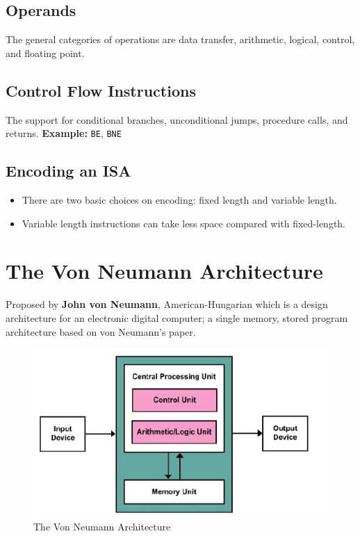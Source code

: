 \documentclass[9pt,twocolumn]{article}
\begin{document}
  \subsection*{Operands}
  The general categories of operations are data transfer, arithmetic, logical, control, and floating point.

  \subsection*{Control Flow Instructions}
  The support for conditional branches, unconditional jumps, procedure calls, and returns. \textbf{Example:} \texttt{BE}, \texttt{BNE}

  \subsection*{Encoding an ISA}
  \begin{itemize}
    \item There are two basic choices on encoding: fixed length and variable length.
    \item Variable length instructions can take less space compared with fixed-length.
  \end{itemize}

\section*{The Von Neumann Architecture}
  Proposed by \textbf{John von Neumann}, American-Hungarian which is a design architecture for an electronic digital computer; a single memory, stored program architecture based on von Neumann’s paper.
  \begin{figure}[h]
    \centering
    \includegraphics[scale=0.6]{./assets/001/von-neumann.png}
    \caption{The Von Neumann Architecture}
  \end{figure}
\end{document}
